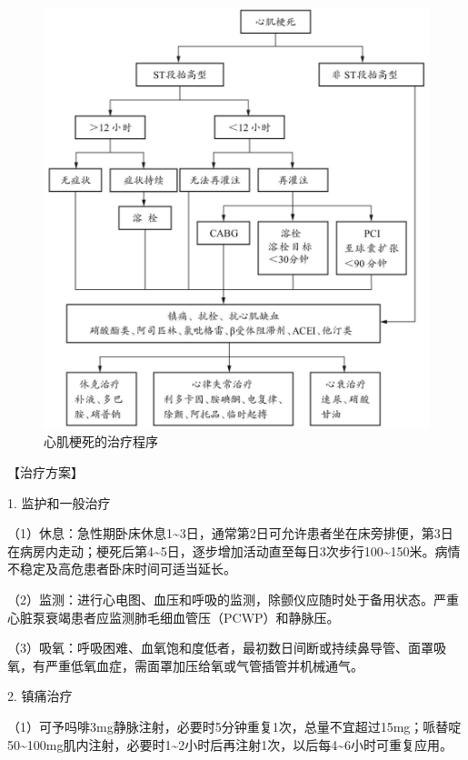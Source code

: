 \begin{figure}[!htbp]
 \centering
 \includegraphics{./images/Image00072.jpg}
 \captionsetup{justification=centering}
 \caption{心肌梗死的治疗程序}
 \label{fig2-5-1}
  \end{figure} 

【治疗方案】

1. 监护和一般治疗

（1）休息：急性期卧床休息1\textasciitilde{}3日，通常第2日可允许患者坐在床旁排便，第3日在病房内走动；梗死后第4\textasciitilde{}5日，逐步增加活动直至每日3次步行100\textasciitilde{}150米。病情不稳定及高危患者卧床时间可适当延长。

（2）监测：进行心电图、血压和呼吸的监测，除颤仪应随时处于备用状态。严重心脏泵衰竭患者应监测肺毛细血管压（PCWP）和静脉压。

（3）吸氧：呼吸困难、血氧饱和度低者，最初数日间断或持续鼻导管、面罩吸氧，有严重低氧血症，需面罩加压给氧或气管插管并机械通气。

2. 镇痛治疗

（1）可予吗啡3mg静脉注射，必要时5分钟重复1次，总量不宜超过15mg；哌替啶50\textasciitilde{}100mg肌内注射，必要时1\textasciitilde{}2小时后再注射1次，以后每4\textasciitilde{}6小时可重复应用。

